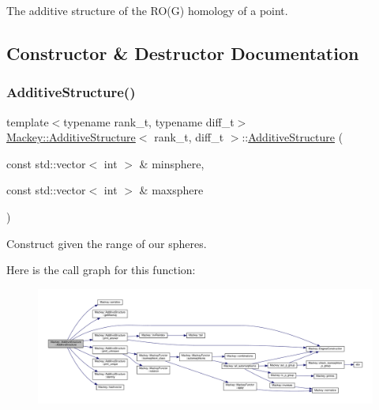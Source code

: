 The additive structure of the R\+O(\+G) homology of a point. 

\subsection{Constructor \& Destructor Documentation}
\mbox{\label{classMackey_1_1AdditiveStructure_a6e6b98b9df433129320045abd5e50bab}} 
\subsubsection{\texorpdfstring{Additive\+Structure()}{AdditiveStructure()}}
{\footnotesize\ttfamily template$<$typename rank\+\_\+t, typename diff\+\_\+t$>$ \\
\hyperlink{classMackey_1_1AdditiveStructure}{Mackey\+::\+Additive\+Structure}$<$ rank\+\_\+t, diff\+\_\+t $>$\+::\hyperlink{classMackey_1_1AdditiveStructure}{Additive\+Structure} (\begin{DoxyParamCaption}\item[{const std\+::vector$<$ int $>$ \&}]{minsphere,  }\item[{const std\+::vector$<$ int $>$ \&}]{maxsphere }\end{DoxyParamCaption})\hspace{0.3cm}{\ttfamily [inline]}}



Construct given the range of our spheres. 

Here is the call graph for this function\+:\nopagebreak
\begin{figure}[H]
\begin{center}
\leavevmode
\includegraphics[width=350pt]{classMackey_1_1AdditiveStructure_a6e6b98b9df433129320045abd5e50bab_cgraph}
\end{center}
\end{figure}


